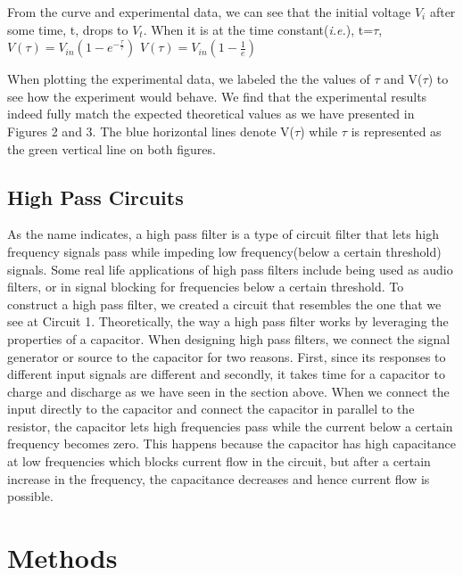 \documentclass[twocolumn]{article}\usepackage[english]{babel}
\begin{document}
From the curve and experimental data, we can see that the initial voltage
$V_i$ after some time, t, drops to $V_t$. When it is at the time
constant(\textit{i.e.}), t=$\tau$, \newline \newline
\(V(\tau) = V_{in}\left(1 - e^{-\frac{\tau}{\tau}}\right)\) \newline
\(V(\tau) = V_{in}\left(1-\frac{1}{e}\right)\) \newline 

When plotting the experimental data, we labeled the the values of $\tau$ and V($\tau$) to see how the experiment would behave. We find that the experimental results indeed fully match the expected theoretical values as we have presented in Figures 2 and 3. The blue horizontal lines denote V($\tau$) while $\tau$ is represented as the green vertical line on both figures.   
\subsection{High Pass Circuits}
As the name indicates, a high pass filter is a type of circuit filter that lets high frequency signals pass while impeding low frequency(below a certain threshold) signals. Some real life applications of high pass filters include being used as audio filters, or in signal blocking for frequencies below a certain threshold. To construct a high pass filter, we created a circuit that resembles the one that we see at Circuit 1. Theoretically, the way a high pass filter works by leveraging the properties of a capacitor. When designing high pass filters, we connect the signal generator or source to the capacitor for two reasons. First, since its responses to different input signals are different and secondly, it takes time for a capacitor to charge and discharge as we have seen in the section above. 
When we connect the input directly to the capacitor and connect the capacitor in parallel to the resistor, the capacitor lets high frequencies pass while the current below a certain frequency becomes zero. This happens because the capacitor has high capacitance at low frequencies which blocks current flow in the circuit, but after a certain increase in the frequency, the capacitance decreases and hence current flow is possible.
\section{Methods}
\end{document}

